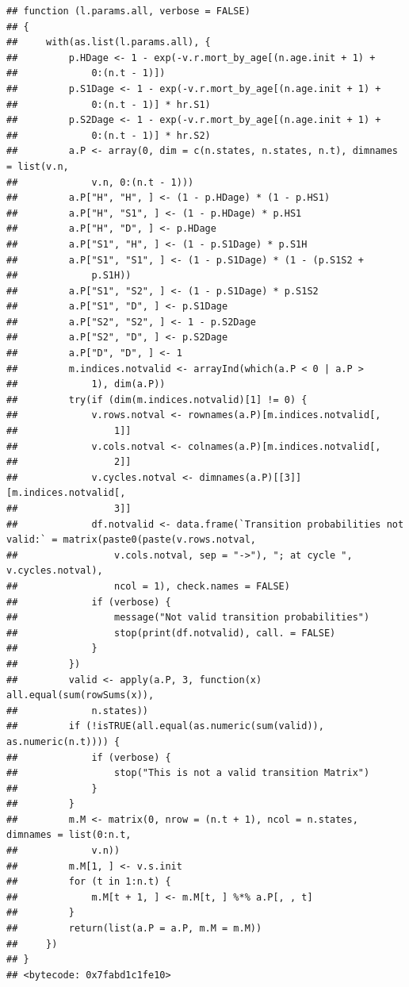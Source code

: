 \documentclass[]{article}
\begin{document}
\begin{verbatim}
## function (l.params.all, verbose = FALSE) 
## {
##     with(as.list(l.params.all), {
##         p.HDage <- 1 - exp(-v.r.mort_by_age[(n.age.init + 1) + 
##             0:(n.t - 1)])
##         p.S1Dage <- 1 - exp(-v.r.mort_by_age[(n.age.init + 1) + 
##             0:(n.t - 1)] * hr.S1)
##         p.S2Dage <- 1 - exp(-v.r.mort_by_age[(n.age.init + 1) + 
##             0:(n.t - 1)] * hr.S2)
##         a.P <- array(0, dim = c(n.states, n.states, n.t), dimnames = list(v.n, 
##             v.n, 0:(n.t - 1)))
##         a.P["H", "H", ] <- (1 - p.HDage) * (1 - p.HS1)
##         a.P["H", "S1", ] <- (1 - p.HDage) * p.HS1
##         a.P["H", "D", ] <- p.HDage
##         a.P["S1", "H", ] <- (1 - p.S1Dage) * p.S1H
##         a.P["S1", "S1", ] <- (1 - p.S1Dage) * (1 - (p.S1S2 + 
##             p.S1H))
##         a.P["S1", "S2", ] <- (1 - p.S1Dage) * p.S1S2
##         a.P["S1", "D", ] <- p.S1Dage
##         a.P["S2", "S2", ] <- 1 - p.S2Dage
##         a.P["S2", "D", ] <- p.S2Dage
##         a.P["D", "D", ] <- 1
##         m.indices.notvalid <- arrayInd(which(a.P < 0 | a.P > 
##             1), dim(a.P))
##         try(if (dim(m.indices.notvalid)[1] != 0) {
##             v.rows.notval <- rownames(a.P)[m.indices.notvalid[, 
##                 1]]
##             v.cols.notval <- colnames(a.P)[m.indices.notvalid[, 
##                 2]]
##             v.cycles.notval <- dimnames(a.P)[[3]][m.indices.notvalid[, 
##                 3]]
##             df.notvalid <- data.frame(`Transition probabilities not valid:` = matrix(paste0(paste(v.rows.notval, 
##                 v.cols.notval, sep = "->"), "; at cycle ", v.cycles.notval), 
##                 ncol = 1), check.names = FALSE)
##             if (verbose) {
##                 message("Not valid transition probabilities")
##                 stop(print(df.notvalid), call. = FALSE)
##             }
##         })
##         valid <- apply(a.P, 3, function(x) all.equal(sum(rowSums(x)), 
##             n.states))
##         if (!isTRUE(all.equal(as.numeric(sum(valid)), as.numeric(n.t)))) {
##             if (verbose) {
##                 stop("This is not a valid transition Matrix")
##             }
##         }
##         m.M <- matrix(0, nrow = (n.t + 1), ncol = n.states, dimnames = list(0:n.t, 
##             v.n))
##         m.M[1, ] <- v.s.init
##         for (t in 1:n.t) {
##             m.M[t + 1, ] <- m.M[t, ] %*% a.P[, , t]
##         }
##         return(list(a.P = a.P, m.M = m.M))
##     })
## }
## <bytecode: 0x7fabd1c1fe10>
\end{verbatim}
\end{document}
